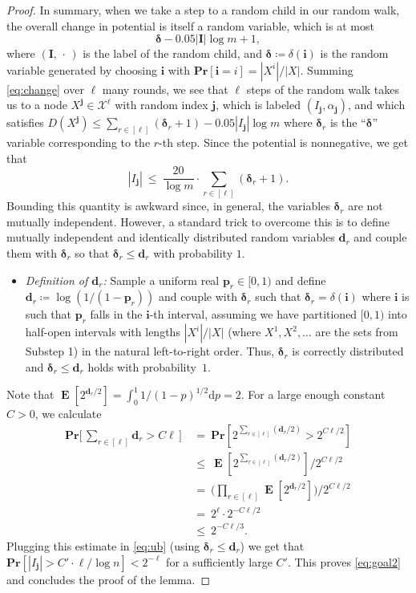\documentclass{toc}
\renewcommand{\Pr}{\mathbf{Pr}}
\DeclareMathOperator{\Ex}{\mathbf{E}}
\newcommand{\bi}{\bm{i}}
\newcommand{\bj}{\bm{j}}
\newcommand{\bdelta}{\bm{\delta}}
\newcommand{\p}{\bm{p}}
\renewcommand{\d}{\bm{d}}
\newcommand{\I}{\bm{I}}
\newcommand{\calX}{\mathcal{X}}
\begin{document}
\begin{proof}
In summary, when we take a step to a random child in our random walk, the overall change in potential is itself a random variable, which is at most
\begin{equation}\label{eq:change}
\bdelta-0.05|\I|\log m +1,
\end{equation}
where $(\I,\,\cdot\,)$ is the label of the random child, and $\bdelta\coloneqq \delta({\bi})$ is the random variable generated by choosing $\bi$ with $\Pr[\bi=i]=|X^i|/|X|$. Summing \eqref{eq:change} over $\ell$ many rounds, we see that $\ell$ steps of the random walk takes us to a node $X^{\bj}\in\calX^\ell$ with random index $\bj$, which is labeled $(I_{\bj},\alpha_{\bj})$, and which satisfies $D(X^{\bj}) \leq \sum_{r\in[\ell]}(\bdelta_r+1) - 0.05|I_{\bj}|\log m$ where $\bdelta_r$ is the ``$\bdelta$'' variable corresponding to the $r$-th step. Since the potential is nonnegative, we get that
\begin{equation}\label{eq:ub}
|I_{\bj}|~\leq~ \frac{20}{\log m} \cdot \sum_{r\in[\ell]} (\bdelta_r+1).
\end{equation}
Bounding this quantity is awkward since, in general, the variables $\bdelta_r$ are not mutually independent. However, a standard trick to overcome this is to define mutually independent and identically distributed random variables $\d_r$ and couple them with $\bdelta_r$ so that $\bdelta_r\leq\d_r$ with probability $1$.
\begin{itemize}
\item \emph{Definition of $\d_r$:}
Sample a uniform real $\p_r \in [0,1)$ and define $\d_r \coloneqq \log (1/(1-\p_r))$ and couple with $\bdelta_r$ such that $\bdelta_r = \delta(\bi)$ where $\bi$ is such that $\p_r$ falls in the $\bi$-th interval, assuming we have partitioned $[0,1)$ into half-open intervals with lengths $|X^i|/|X|$ (where $X^1,X^2,\ldots$ are the sets from Substep 1) in the natural left-to-right order. Thus, $\bdelta_r$ is correctly distributed and $\bdelta_r \le \d_r$ holds with probability~$1$.
\end{itemize}	
Note that $\Ex[2^{\d_r/2}] = \int_0^1 1/(1-p)^{1/2} \text{d}p = 2$. For a large enough constant $C>0$, we calculate
\begin{align*}
\textstyle\Pr\big[\,\sum_{r\in[\ell]} \d_r > C\ell\,\big]
&\textstyle~=~ \Pr[2^{\sum_{r\in[\ell]} (\d_r/2)} > 2^{C\ell/2}]\\
&\textstyle~\leq~ \Ex[2^{\sum_{r\in[\ell]} (\d_r/2)}]/2^{C\ell/2}\\
&\textstyle~=~ \big(\prod_{r\in[\ell]}\Ex[2^{\d_r/2}]\big)/2^{C\ell/2}\\
&\textstyle~=~ 2^{\ell} \cdot 2^{-C\ell/2}\\
&\textstyle~\leq~ 2^{-C\ell/3}.
\end{align*}
Plugging this estimate in \eqref{eq:ub} (using $\bdelta_r\leq\d_r$) we get that $\Pr[|I_{\bj}| > C'\cdot \ell/\log n] < 2^{-\ell}$ for a sufficiently large $C'$. This proves \eqref{eq:goal2} and concludes the proof of the lemma.
\end{proof}
\end{document}
